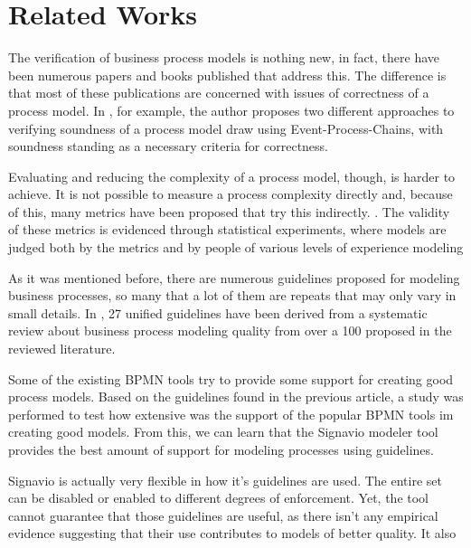 \documentclass{llncs}
\begin{document}
\section{Related Works}\label{RelatedWorks}


The verification of business process models is nothing new, in fact, there have been numerous papers and books published that address this. The difference is that most of these publications are concerned with issues of correctness of a process model. In \cite{Mendling2008}, for example, the author proposes two different approaches to verifying soundness of a process model draw using Event-Process-Chains, with soundness standing as a necessary criteria for correctness.
	
Evaluating and reducing the complexity of a process model, though, is harder to achieve. It is not possible to measure a process complexity directly and, because of this, many metrics have been proposed that try this indirectly. \cite{?}. The validity of these metrics is evidenced through statistical experiments, where models are judged both by the metrics and by people of various  levels of experience modeling 

As it was mentioned before, there are numerous guidelines proposed for modeling business processes, so many that a lot of them are repeats that may only vary in small details. In \cite{Moreno-MontesdeOca2014}, 27 unified guidelines have been derived from a systematic review about business process modeling quality from over a 100 proposed in the reviewed literature. 

Some of the existing BPMN tools try to provide some support for creating good process models. Based on the guidelines found in the previous article, a study \cite{MoniqueSnoeckIsel2015} was performed to test how extensive was the support of the popular BPMN tools im creating good models. From this, we can learn that the Signavio modeler tool provides the best amount of support for modeling processes using guidelines. 

Signavio is actually very flexible in how it's guidelines are used. The entire set can be disabled or enabled to different degrees of enforcement. Yet, the tool cannot guarantee that those guidelines are useful, as there isn't any empirical evidence suggesting that their use contributes to models of better quality. It also 
\end{document}
